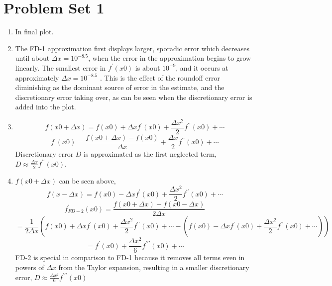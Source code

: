 \documentclass[12pt, preprint]{aastex}
\begin{document}
\section*{Problem Set 1}

\begin{enumerate}
  \item In final plot.

  \item 
    The FD-1 approximation first displays larger, sporadic error which decreases until about $\Delta x = 10^{-8.5}$, when the error in the approximation begins to grow linearly. The smallest error in $f^\prime(x0)$ is about $10^{-9}$, and it occurs at approximately $\Delta x = 10^{-8.5}$ . This is the effect of the roundoff error diminishing as the dominant source of error in the estimate, and the discretionary error taking over, as can be seen when the discretionary error is added into the plot.

  \item 
    \begin{equation} \nonumber
      f(x0+\Delta x) = f(x0)+
      \Delta xf^{\prime}(x0)+  
      \frac{\Delta x^2}{2}f^{\prime\prime}(x0)+\cdots  
    \end{equation}
    \begin{equation} \nonumber
      f^{\prime}(x0) =   \frac{f(x0+\Delta x)-f(x0)}{\Delta x}+
      \frac{\Delta x}{2}f^{\prime\prime}(x0)+\cdots  
    \end{equation}
    Discretionary error $D$ is approximated as the first neglected term, 
    $D \approx \frac{\Delta x}{2}f^{\prime\prime}(x0)$.


   \item $f(x0+\Delta x) $ can be seen above, 
     \begin{equation} \nonumber
       f(x-\Delta x) = f(x0)-
       \Delta xf^\prime(x0)+  
       \frac{\Delta x^2}{2}f^{\prime\prime}(x0)+\cdots  
     \end{equation}
     \begin{equation} \nonumber
       f^\prime_{FD-2}(x0) = \frac{f(x0+\Delta x)-f(x0-\Delta x)}{2\Delta x}
     \end{equation}
     \begin{equation} \nonumber
       = \frac{1}{2\Delta x}(
       f(x0)+\Delta xf^\prime(x0)+
       \frac{\Delta x^2}{2}f^{\prime\prime}(x0)+\cdots  
       -(f(x0)-\Delta xf^\prime(x0)+
       \frac{\Delta x^2}{2}f^{\prime\prime}(x0)+\cdots))
     \end{equation}
     \begin{equation} \nonumber
       = f^\prime(x0)+ \frac{\Delta x^2}{6}f^{\prime\prime\prime}(x0)+ \cdots
     \end{equation}
     FD-2 is special in comparison to FD-1 because it removes all terms even in powers of $\Delta x$ from the Taylor expansion, resulting in a smaller discretionary error, $D \approx \frac{\Delta x^2}{6}f^{\prime\prime\prime}(x0)$



\end{enumerate}
\end{document}
